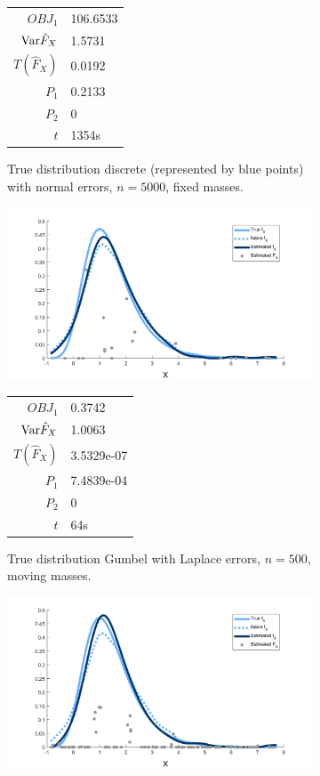 \begin{figure}
\begin{subfigure}[b]{0.38\textwidth}
\begin{tabular}{r l}
			$OBJ_1$ & 106.6533\\
			$\mathrm{Var} \hat{F}_X$ & 1.5731\\
			$T(\hat{F}_X)$ & 0.0192\\
			$P_1$ & 0.2133\\
			$P_2$ & 0\\
			$t$ & 1354s
		\end{tabular}
		\caption{True distribution discrete (represented by blue points) with normal errors, $n = 5000$, fixed masses.}
		\label{fig:fixed masses discrete}
	\end{subfigure}
	\begin{subfigure}[b]{0.38\textwidth}
		\centering
		\includegraphics[width = \textwidth]{Figures/Deconvolution/moving_masses_gumbel_lap_example.png}
		\begin{tabular}{r l}
			$OBJ_1$ & 0.3742\\
			$\mathrm{Var} \hat{F}_X$ & 1.0063\\
			$T(\hat{F}_X)$ & 3.5329e-07\\
			$P_1$ & 7.4839e-04\\
			$P_2$ & 0\\
			$t$ & 64s
		\end{tabular}
		\caption{True distribution Gumbel with Laplace errors, $n = 500$, moving masses.}
		\label{fig:moving masses gumbel lap}
	\end{subfigure}
	\hfill
	\begin{subfigure}[b]{0.38\textwidth}
		\centering
		\includegraphics[width = \textwidth]{Figures/Deconvolution/fixed_masses_gumbel_lap_example.png}

\end{subfigure}
\end{figure}

